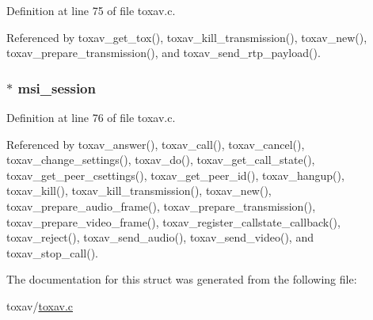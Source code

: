 Definition at line 75 of file toxav.\+c.



Referenced by toxav\+\_\+get\+\_\+tox(), toxav\+\_\+kill\+\_\+transmission(), toxav\+\_\+new(), toxav\+\_\+prepare\+\_\+transmission(), and toxav\+\_\+send\+\_\+rtp\+\_\+payload().

\hypertarget{struct___tox_av_a85e3d7dd2ab722ee5ba0cd4b72bc7d60}{
\subsubsection[{msi\+\_\+session}]{$\ast$ msi\+\_\+session}}\label{struct___tox_av_a85e3d7dd2ab722ee5ba0cd4b72bc7d60}


Definition at line 76 of file toxav.\+c.



Referenced by toxav\+\_\+answer(), toxav\+\_\+call(), toxav\+\_\+cancel(), toxav\+\_\+change\+\_\+settings(), toxav\+\_\+do(), toxav\+\_\+get\+\_\+call\+\_\+state(), toxav\+\_\+get\+\_\+peer\+\_\+csettings(), toxav\+\_\+get\+\_\+peer\+\_\+id(), toxav\+\_\+hangup(), toxav\+\_\+kill(), toxav\+\_\+kill\+\_\+transmission(), toxav\+\_\+new(), toxav\+\_\+prepare\+\_\+audio\+\_\+frame(), toxav\+\_\+prepare\+\_\+transmission(), toxav\+\_\+prepare\+\_\+video\+\_\+frame(), toxav\+\_\+register\+\_\+callstate\+\_\+callback(), toxav\+\_\+reject(), toxav\+\_\+send\+\_\+audio(), toxav\+\_\+send\+\_\+video(), and toxav\+\_\+stop\+\_\+call().



The documentation for this struct was generated from the following file\+:\begin{DoxyCompactItemize}
\item 
toxav/\hyperlink{toxav_8c}{toxav.\+c}\end{DoxyCompactItemize}
